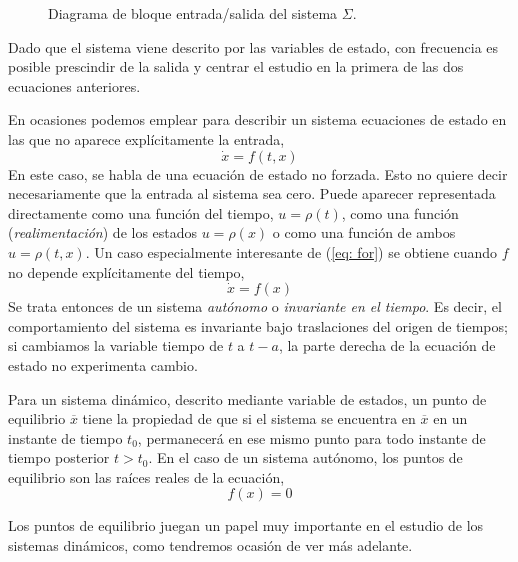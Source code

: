 \begin{figure}[!ht]
\centering
{}
	\caption{Diagrama de bloque entrada/salida del sistema $\Sigma$.}
	\label{fig: sigma}
\end{figure}

Dado que el sistema viene descrito por las variables de estado,  con frecuencia es posible prescindir de la salida y centrar el estudio en la primera de las dos ecuaciones anteriores.

 En ocasiones podemos emplear para describir un sistema ecuaciones de estado en las que no aparece explícitamente la entrada,
\begin{equation}
\dot x = f(t,x)
\end{equation}\label{eq: for}
En este caso, se habla de una ecuación de estado no forzada. Esto no quiere decir necesariamente que la entrada al sistema sea cero. Puede aparecer representada directamente como una función del tiempo, $u=\rho(t)$,  como una función (\emph{realimentación}) de los estados $u = \rho(x)$ o como una función de ambos $u=\rho(t,x)$.
Un caso especialmente interesante de (\ref{eq: for}) se obtiene cuando $f$ no depende explícitamente del tiempo,
\begin{equation}
\dot x = f(x)
\end{equation}
Se trata entonces de un sistema \emph{autónomo} o \emph{invariante en el tiempo}. Es decir, el comportamiento del sistema es invariante bajo traslaciones del origen de tiempos; si cambiamos la variable tiempo de $t$ a $t-a$, la parte derecha de la ecuación de estado no experimenta cambio.

Para un sistema dinámico, descrito mediante variable de estados, un punto de equilibrio $\overline x$  tiene la propiedad de que si el sistema se encuentra en $\overline x$ en un instante de tiempo $t_0$, permanecerá en ese  mismo punto para todo instante de tiempo posterior $t>t_0$. En el caso de un sistema autónomo, los puntos de equilibrio son las raíces reales de la ecuación,
\begin{equation}
f(x)=0
\end{equation} 

Los puntos de equilibrio juegan un papel muy importante en el estudio de los sistemas dinámicos, como tendremos ocasión de ver más adelante.

